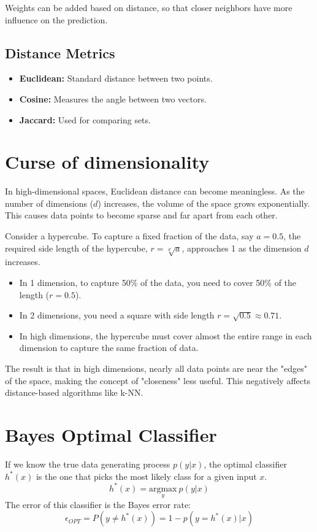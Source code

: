 \documentclass{article}
\begin{document}
\begin{multicols}{2}
Weights can be added based on distance, so that closer neighbors have more influence on the prediction. 

\subsection{Distance Metrics}
\begin{itemize}
    \item \textbf{Euclidean:} Standard distance between two points. 
    \item \textbf{Cosine:} Measures the angle between two vectors. 
    \item \textbf{Jaccard:} Used for comparing sets. 
\end{itemize}

\section{Curse of dimensionality}
In high-dimensional spaces, Euclidean distance can become meaningless.  As the number of dimensions ($d$) increases, the volume of the space grows exponentially.  This causes data points to become sparse and far apart from each other. 

Consider a hypercube. To capture a fixed fraction of the data, say $a=0.5$, the required side length of the hypercube, $r = \sqrt[d]{a}$, approaches 1 as the dimension $d$ increases. 
\begin{itemize}
    \item In 1 dimension, to capture 50\% of the data, you need to cover 50\% of the length ($r=0.5$). 
    \item In 2 dimensions, you need a square with side length $r = \sqrt{0.5} \approx 0.71$. 
    \item In high dimensions, the hypercube must cover almost the entire range in each dimension to capture the same fraction of data. 
\end{itemize}
The result is that in high dimensions, nearly all data points are near the "edges" of the space, making the concept of "closeness" less useful.  This negatively affects distance-based algorithms like k-NN. 

\section{Bayes Optimal Classifier}
If we know the true data generating process $p(y|x)$, the optimal classifier $h^*(x)$ is the one that picks the most likely class for a given input $x$. 
$$ h^*(x) = \underset{y}{\text{argmax}} \ p(y|x) $$
The error of this classifier is the Bayes error rate:
$$ \epsilon_{OPT} = P(y \neq h^*(x)) = 1 - p(y=h^*(x)|x) $$


\end{multicols}
\end{document}
